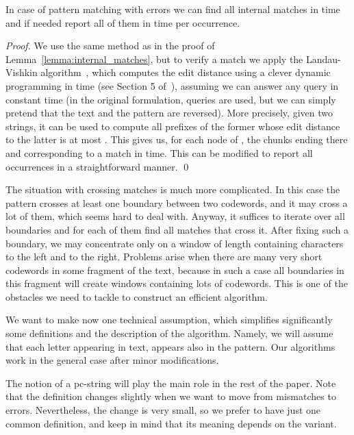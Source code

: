 \documentclass[runningheads]{llncs}
\begin{document}
\begin{lemma}\label{lemma:internal_matches_errors}
In case of pattern matching with errors we can find all internal matches in  time and if needed report all of them in  time per occurrence.
\end{lemma}
\begin{proof}
We use the same method as in the proof of Lemma~\ref{lemma:internal_matches}, but to verify a match we apply the Landau-Vishkin algorithm~\cite{Landau}, which computes the edit distance using a clever dynamic programming in  time (see Section 5 of~\cite{ColeHariharan}), assuming we can answer any  query in constant time (in the original formulation,  queries are used, but we can simply pretend that the text and the pattern are reversed). More precisely, given two strings, it can be used to compute all prefixes of the former whose edit distance to the latter is at most . This gives us, for each node of , the chunks ending there and corresponding to a match in  time. This can be modified to report all occurrences in a straightforward manner. 
\qed
\end{proof}

The situation with crossing matches is much more complicated. In this case the pattern crosses at least one boundary between two codewords, and it may cross a lot of them, which seems hard to deal with. Anyway, it suffices to iterate over all  boundaries and for each of them find all matches that cross it. After fixing such a boundary, we may concentrate only on a window of length  containing  characters to the left and  to the right. Problems arise when there are many very short codewords in some fragment of the text, because in such a case all boundaries in this fragment will create windows containing lots of codewords. This is one of the obstacles we need to tackle to construct an efficient algorithm.

We want to make now one technical assumption, which simplifies significantly some definitions and the description of the algorithm. Namely, we will assume that each letter appearing in text, appears also in the pattern. Our algorithms work in the general case after minor modifications.

The notion of a pc-string will play the main role in the rest of the paper. Note that the definition changes slightly when we want to move from mismatches to errors. Nevertheless, the change is very small, so we prefer to have just one common definition, and keep in mind that its meaning depends on the variant.
\end{document}
